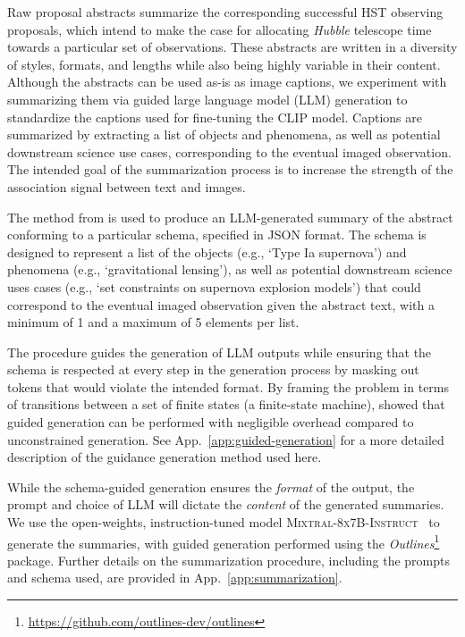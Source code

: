 \documentclass[10pt]{article} %
\newcommand{\package}[1]{\textsl{#1}\xspace}
\newcommand{\hubble}{\emph{Hubble}\xspace}
\begin{document}
Raw proposal abstracts summarize the corresponding successful HST observing proposals, which intend to make the case for allocating \hubble telescope time towards a particular set of observations.
%
These abstracts are written in a diversity of styles, formats, and lengths while also being highly variable in their content.
%
Although the abstracts can be used as-is as image captions, we experiment with summarizing them via guided large language model (LLM) generation to standardize the captions used for fine-tuning the CLIP model.
%
Captions are summarized by extracting a list of objects and phenomena, as well as potential downstream science use cases, corresponding to the eventual imaged observation.
The intended goal of the summarization process is to increase the strength of the association signal between text and images.

The method from \cite{willard2023efficient} is used to produce an LLM-generated summary of the abstract conforming to a particular schema, specified in JSON format.
%
The schema is designed to represent a list of the objects (e.g., `Type Ia supernova') and phenomena (e.g., `gravitational lensing'), as well as potential downstream science uses cases (e.g., `set constraints on supernova explosion models') that could correspond to the eventual imaged observation given the abstract text, with a minimum of 1 and a maximum of 5 elements per list.

The procedure guides the generation of LLM outputs while ensuring that the schema is respected at every step in the generation process by masking out tokens that would violate the intended format.
%
By framing the problem in terms of transitions between a set of finite states (a finite-state machine), \cite{willard2023efficient} showed that guided generation can be performed with negligible overhead compared to unconstrained generation.
%
See App.~\ref{app:guided-generation} for a more detailed description of the guidance generation method used here.

While the schema-guided generation ensures the \emph{format} of the output, the prompt and choice of LLM will dictate the \emph{content} of the generated summaries.
%
We use the open-weights, instruction-tuned model \textsc{Mixtral-8x7B-Instruct}~\citep{jiang2024mixtral} to generate the summaries, with guided generation performed using the \package{Outlines}\footnote{\url{https://github.com/outlines-dev/outlines}} package.
%
Further details on the summarization procedure, including the prompts and schema used, are provided in App.~\ref{app:summarization}.
\end{document}
